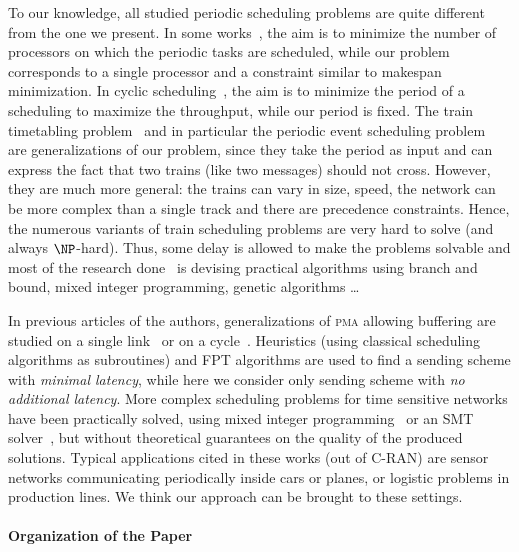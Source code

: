 \documentclass[a4paper,cleveref, autoref, thm-restate,UKenglish]{lipics-v2019}
\newcommand\pma{\textsc{pma}\xspace}
\begin{document}
 To our knowledge, all studied periodic scheduling problems are quite different from the one we present.
In some works~\cite{korst1991periodic,hanen1993cyclic}, the aim is to minimize the number of processors on which the periodic tasks are scheduled, while our problem corresponds to a single processor and a constraint similar to makespan minimization. In cyclic scheduling~\cite{levner2010complexity}, the aim is to minimize the period of a scheduling to maximize the throughput, while our period is fixed. The train timetabling problem~\cite{lusby2011railway} and in particular the periodic event scheduling problem~\cite{serafini1989mathematical} are generalizations of our problem, since they take the period as input and can express the fact that two trains (like two messages) should not cross. However, they are much more general: the trains can vary in size, speed, the network can be more complex than a single track and there are precedence constraints. Hence, the numerous variants of train scheduling problems are very hard to solve (and always $\NP$-hard). Thus, some delay is allowed to make the problems solvable and most of the research done~\cite{lusby2011railway} is devising practical algorithms using branch and bound, mixed integer programming, genetic algorithms \dots

In previous articles of the authors, generalizations of \pma allowing buffering are studied on a single link~\cite{dominique2018deterministic} or on a cycle~\cite{Guir1905:Deterministic}. Heuristics (using classical scheduling algorithms as subroutines) and FPT algorithms are used to find a sending scheme with \emph{minimal latency}, while here we consider only sending scheme with \emph{no additional latency}. More complex scheduling problems for time sensitive networks have been practically solved, using mixed integer programming~\cite{nayak2017incremental,steiner2018traffic} or an SMT solver~\cite{dos2019tsnsched}, but without theoretical guarantees on the quality of the produced solutions. Typical applications cited in these works (out of C-RAN) are sensor networks communicating periodically inside cars or planes, or logistic problems in production lines. We think our approach can be brought to these settings.



\paragraph*{Organization of the Paper}
\end{document}
